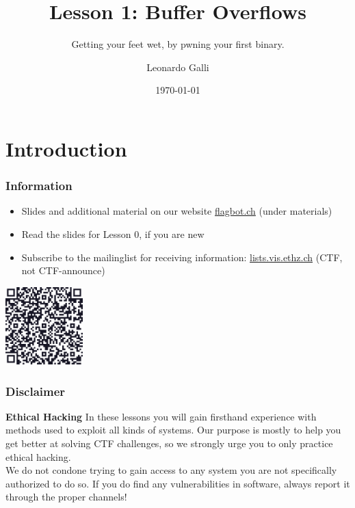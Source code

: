 \documentclass[aspectratio=169]{beamer}
\title{Lesson 1: Buffer Overflows}
\subtitle{Getting your feet wet, by pwning your first binary.}
\author{Leonardo Galli}
\date{\today}
\begin{document}
\titleframe

\tocframe

\section{Introduction}

\begin{frame}
    \frametitle{Information}
    \begin{itemize}
        \item Slides and additional material on our website \href{https://flagbot.ch}{flagbot.ch} (under materials)
        \item Read the slides for Lesson 0, if you are new
        \item Subscribe to the mailinglist for receiving information: \href{https://lists.vis.ethz.ch/postorius/lists/ctf.lists.vis.ethz.ch/}{lists.vis.ethz.ch} (CTF, not CTF-announce)
    \end{itemize}
    \begin{center}
        \includegraphics[width=3cm]{mailing-list.png}
    \end{center}
\end{frame}

\begin{frame}
    \frametitle{Disclaimer}
    \begin{alertblock}{\textbf{Ethical Hacking}}
    {
        In these lessons you will gain firsthand experience with methods used to exploit all kinds of systems.
        Our purpose is mostly to help you get better at solving CTF challenges, so we strongly urge you to only practice ethical hacking.\\
        We do not condone trying to gain access to any system you are not specifically authorized to do so.
        If you do find any vulnerabilities in software, always report it through the proper channels!
    }
    \end{alertblock}    
\end{frame}
\end{document}
